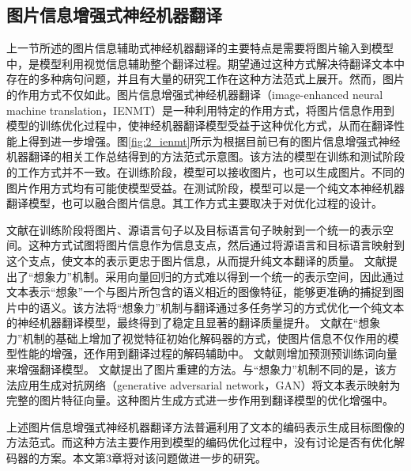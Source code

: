 \subsection{图片信息增强式神经机器翻译}

上一节所述的图片信息辅助式神经机器翻译的主要特点是需要将图片输入到模型中，是模型利用视觉信息辅助整个翻译过程。期望通过这种方式解决待翻译文本中存在的多种病句问题，并且有大量的研究工作在这种方法范式上展开。然而，图片的作用方式不仅如此。图片信息增强式神经机器翻译（image-enhanced neural machine translation，IENMT）是一种利用特定的作用方式，将图片信息作用到模型的训练优化过程中，使神经机器翻译模型受益于这种优化方式，从而在翻译性能上得到进一步增强。图\ref{fig:2_ienmt}所示为根据目前已有的图片信息增强式神经机器翻译的相关工作总结得到的方法范式示意图。该方法的模型在训练和测试阶段的工作方式并不一致。在训练阶段，模型可以接收图片，也可以生成图片。不同的图片作用方式均有可能使模型受益。在测试阶段，模型可以是一个纯文本神经机器翻译模型，也可以融合图片信息。其工作方式主要取决于对优化过程的设计。

文献\cite{54_DBLP:journals/mt/NakayamaN17,68_DBLP:journals/corr/KirosSZ14,115_saha-etal-2016-correlational}在训练阶段将图片、源语言句子以及目标语言句子映射到一个统一的表示空间。这种方式试图将图片信息作为信息支点，然后通过将源语言和目标语言映射到这个支点，使文本的表示更忠于图片信息，从而提升纯文本翻译的质量。
文献\cite{37_elliott-kadar-2017-imagination}提出了“想象力”机制。采用向量回归的方式难以得到一个统一的表示空间，因此通过文本表示“想象”一个与图片所包含的语义相近的图像特征，能够更准确的捕捉到图片中的语义。该方法将“想象力”机制与翻译通过多任务学习的方式优化一个纯文本的神经机器翻译模型，最终得到了稳定且显著的翻译质量提升。
文献\cite{56_zhou-etal-2018-visual}在“想象力”机制的基础上增加了视觉特征初始化解码器的方式，使图片信息不仅作用的模型性能的增强，还作用到翻译过程的解码辅助中。
文献\cite{116_DBLP:conf/naacl/HirasawaYMK19}则增加预测预训练词向量来增强翻译模型。
文献\cite{117_DBLP:journals/corr/abs-1910-02766}提出了图片重建的方法。与“想象力”机制不同的是，该方法应用生成对抗网络（generative adversarial network，GAN）将文本表示映射为完整的图片特征向量。这种图片生成方式进一步作用到翻译模型的优化增强中。

上述图片信息增强式神经机器翻译方法普遍利用了文本的编码表示生成目标图像的方法范式。而这种方法主要作用到模型的编码优化过程中，没有讨论是否有优化解码器的方案。本文第3章将对该问题做进一步的研究。